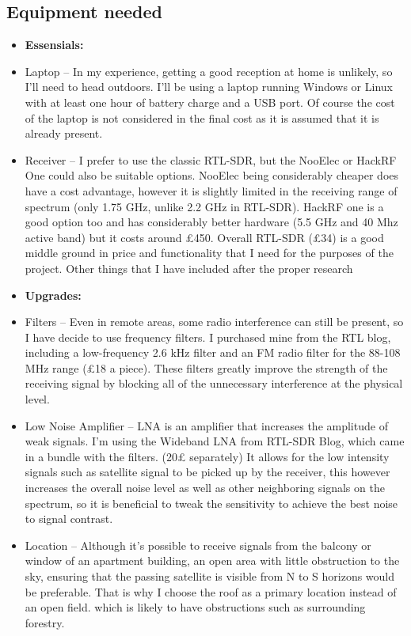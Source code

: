 \documentclass{article}
\begin{document}
    \subsection{Equipment needed}
    \begin{itemize}
        \item[] \textbf{Essensials:}
        \item Laptop -- In my experience, getting a good reception at home is unlikely, so I'll need to head outdoors. I'll be using a laptop running Windows or Linux with at least one hour of battery charge and a USB port. Of course the cost of the laptop is not considered in the final cost as it is assumed that it is already present.
        \item Receiver -- I prefer to use the classic RTL-SDR, but the NooElec or HackRF One could also be suitable options. NooElec being considerably cheaper does have a cost advantage, however it is slightly limited in the receiving range of spectrum (only 1.75 GHz, unlike 2.2 GHz in RTL-SDR). HackRF one is a good option too and has considerably better hardware (5.5 GHz and 40 Mhz active band) but it costs around £450. Overall RTL-SDR (£34) is a good middle ground in price and functionality that I need for the purposes of the project.
        Other things that I have included after the proper research
        \item[] \textbf{Upgrades:}
        \item Filters -- Even in remote areas, some radio interference can still be present, so I have decide to use frequency filters. I purchased mine from the RTL blog, including a low-frequency 2.6 kHz filter and an FM radio filter  for the 88-108 MHz range (£18 a piece). These filters greatly improve the strength of the receiving signal by blocking all of the unnecessary interference at the physical level.
        \item Low Noise Amplifier -- LNA is an amplifier that increases the amplitude of weak signals. I'm using the Wideband LNA from RTL-SDR Blog, which came in a bundle with the filters. (20£ separately) It allows for the low intensity signals such as satellite signal to be picked up by the receiver, this however increases the overall noise level as well as other neighboring signals on the spectrum, so it is beneficial to tweak the sensitivity to achieve the best noise to signal contrast.
        \item Location -- Although it's possible to receive signals from the balcony or window of an apartment building, an open area with little obstruction to the sky, ensuring that the passing satellite is visible from N to S horizons would be preferable. That is why I choose the roof as a primary location instead of an open field. which is likely to have obstructions such as surrounding forestry.

\end{itemize}
\end{document}
